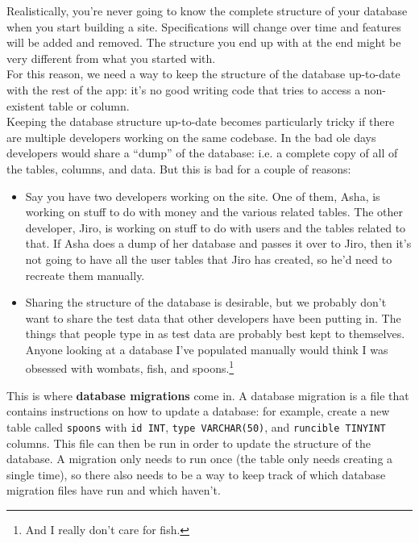 Realistically, you're never going to know the complete structure of your database when you start building a site. Specifications will change over time and features will be added and removed. The structure you end up with at the end might be very different from what you started with.
\\

For this reason, we need a way to keep the structure of the database up-to-date with the rest of the app: it's no good writing code that tries to access a non-existent table or column.
\\

Keeping the database structure up-to-date becomes particularly tricky if there are multiple developers working on the same codebase. In the bad ole days developers would share a ``dump'' of the database: i.e. a complete copy of all of the tables, columns, and data. But this is bad for a couple of reasons:

\begin{itemize}
    \item Say you have two developers working on the site. One of them, Asha, is working on stuff to do with money and the various related tables. The other developer, Jiro, is working on stuff to do with users and the tables related to that. If Asha does a dump of her database and passes it over to Jiro, then it's not going to have all the user tables that Jiro has created, so he'd need to recreate them manually.

    \item Sharing the structure of the database is desirable, but we probably don't want to share the test data that other developers have been putting in. The things that people type in as test data are probably best kept to themselves. Anyone looking at a database I've populated manually would think I was obsessed with wombats, fish, and spoons.\footnote{And I really don't care for fish.}
\end{itemize}

This is where \textbf{database migrations} come in. A database migration is a file that contains instructions on how to update a database: for example, create a new table called \texttt{spoons} with \texttt{id INT}, \texttt{type VARCHAR(50)}, and \texttt{runcible TINYINT} columns. This file can then be run in order to update the structure of the database. A migration only needs to run once (the table only needs creating a single time), so there also needs to be a way to keep track of which database migration files have run and which haven't.



